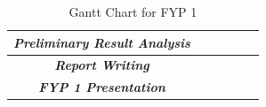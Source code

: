 \begin{table}[]
\begin{tabular}{|c|l|l|l|l|l|}
\textit{\textbf{Preliminary Result Analysis}} &                                               &                                               &                          & \cellcolor[HTML]{FFCB2F} & \cellcolor[HTML]{FFCB2F} \\ \hline
\textit{\textbf{Report Writing}}              & \cellcolor[HTML]{FFCB2F}                      & \cellcolor[HTML]{FFCB2F}                      & \cellcolor[HTML]{FFCB2F} & \cellcolor[HTML]{FFCB2F} & \cellcolor[HTML]{FFCB2F} \\ \hline
\textit{\textbf{FYP 1 Presentation}}          &                                               &                                               &                          &                          & \cellcolor[HTML]{FFCB2F} \\ \hline
\end{tabular}
\caption{Gantt Chart for FYP 1}
\label{tab:gantt-chart-fyp1}
\end{table}

